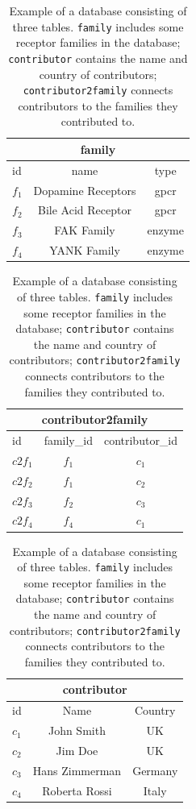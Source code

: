 \begin{table}[]
\centering
\begin{tabular}{| l | cc |}
\multicolumn{3}{c}{\textbf{family}}\\
\hline
 id & name & type \\
  \hline
  $f_1$ & Dopamine Receptors & gpcr \\
  $f_2$ & Bile Acid Receptor & gpcr \\
  $f_3$ & FAK Family         & enzyme \\
  $f_4$ & YANK Family        & enzyme \\
\hline
\end{tabular}	
\begin{tabular}{| l |c c|}
\multicolumn{3}{c}{\textbf{contributor2family}}\\
\hline
 id & family\_id & contributor\_id \\
  \hline
  $c2f_1$ & $f_1$ & $c_1$ \\
  $c2f_2$ & $f_1$ & $c_2$ \\
  $c2f_3$ & $f_2$ & $c_3$ \\
  $c2f_4$ & $f_4$ & $c_1$ \\
\hline
\end{tabular}		
\begin{tabular}{| l |c c|}
\multicolumn{3}{c}{\textbf{contributor}}\\
\hline
 id & Name & Country \\
  \hline
  $c_1$ & John Smith & UK \\
  $c_2$ & Jim Doe & UK \\
  $c_3$ & Hans Zimmerman & Germany \\
  $c_4$ & Roberta Rossi & Italy \\
\hline
\end{tabular}		
\caption{Example of a database consisting of three tables. \texttt{family} includes some receptor families in the database; \texttt{contributor} contains the name and country of contributors; \texttt{contributor2family} connects contributors to the families they contributed to.}
\label{table:running_example}
\end{table}
